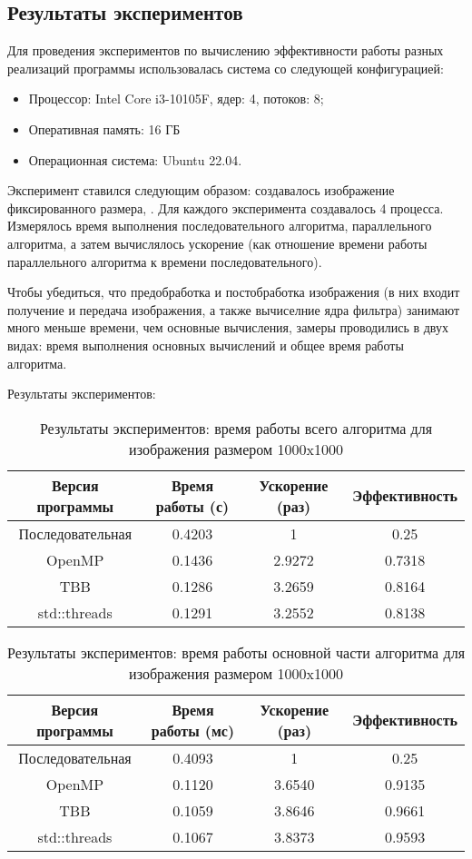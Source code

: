 \documentclass{article}
\begin{document}
\subsection*{Результаты экспериментов}
Для проведения экспериментов по вычислению эффективности работы разных реализаций программы использовалась система со следующей конфигурацией:
\begin{itemize}
\item Процессор: Intel Core i3-10105F, ядер: 4, потоков: 8;
\item Оперативная память: 16 ГБ
\item Операционная система: Ubuntu 22.04.
\end{itemize}
Эксперимент ставился следующим образом: создавалось изображение фиксированного размера, . Для каждого эксперимента создавалось 4 процесса. Измерялось время выполнения последовательного алгоритма, параллельного алгоритма, а затем вычислялось ускорение (как отношение времени работы параллельного алгоритма к времени последовательного).
\par
Чтобы убедиться, что предобработка и постобработка изображения (в них входит получение и передача изображения, а также вычиселние ядра фильтра) занимают много меньше времени, чем основные вычисления, замеры проводились в двух видах: время выполнения основных вычислений и общее время работы алгоритма.
\par Результаты экспериментов:
\begin{table}[!h]
\centering
\begin{tabular}{| c | c | c | c |}
\hline
Версия программы & Время работы (с) & Ускорение (раз) & Эффективность\\
\hline
Последовательная  & 0.4203 & 1 & 0.25 \\
OpenMP  & 0.1436& 2.9272& 0.7318 \\
TBB  & 0.1286 & 3.2659 & 0.8164 \\
std::threads  & 0.1291& 3.2552 & 0.8138 \\
\hline
\end{tabular}
\caption{Результаты экспериментов: время работы всего алгоритма для изображения размером 1000x1000}
\end{table}
\begin{table}[!h]
\centering
\begin{tabular}{| c | c | c | c |}
\hline
Версия программы & Время работы (мс) & Ускорение (раз) & Эффективность\\
\hline
Последовательная  & 0.4093 & 1 & 0.25\\
OpenMP  & 0.1120 & 3.6540 & 0.9135\\
TBB  & 0.1059 & 3.8646 & 0.9661 \\
std::threads  & 0.1067 & 3.8373 & 0.9593 \\
\hline
\end{tabular}
\caption{Результаты экспериментов: время работы основной части алгоритма для изображения размером 1000x1000}
\end{table}
\end{document}
